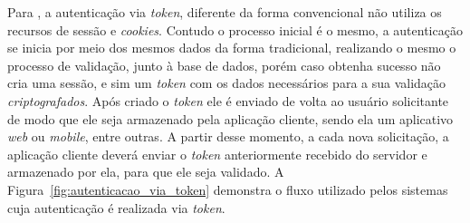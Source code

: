 Para , a autenticação via \textit{token}, diferente da forma convencional não utiliza os recursos de sessão e \textit{cookies}. Contudo o processo inicial é o mesmo, a autenticação se inicia por meio dos mesmos dados da forma tradicional, realizando o mesmo o processo de validação, junto à base de dados, porém caso obtenha sucesso não cria uma sessão, e sim um \textit{token} com os dados necessários para a sua validação \textit{criptografados}. Após criado o \textit{token} ele é enviado de volta ao usuário solicitante de modo que ele seja armazenado pela aplicação cliente, sendo ela um aplicativo \textit{web} ou \textit{mobile}, entre outras. A partir desse momento, a cada nova solicitação, a aplicação cliente deverá enviar o \textit{token} anteriormente recebido do servidor e armazenado por ela, para que ele seja validado. A Figura~\ref{fig:autenticacao_via_token} demonstra o fluxo utilizado pelos sistemas cuja autenticação é realizada via \textit{token}.

